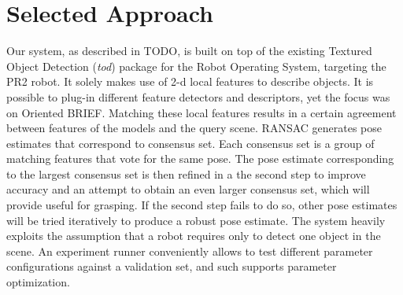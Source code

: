 
\section{Selected Approach}

Our system, as described in TODO, is built on top of the existing Textured
Object Detection ({\it tod}) package for the Robot Operating System, targeting
the PR2 robot. It solely makes use of 2-d local features to describe objects.
It is possible to plug-in different feature detectors and descriptors, yet the
focus was on Oriented BRIEF.  Matching these local features results in a
certain agreement between features of the models and the query scene. RANSAC
generates pose estimates that correspond to consensus set. Each consensus set
is a group of matching features that vote for the same pose. The pose estimate
corresponding to the largest consensus set is then refined in a the second step
to improve accuracy and an attempt to obtain an even larger consensus set,
which will provide useful for grasping. If the second step fails to do so,
other pose estimates will be tried iteratively to produce a robust pose
estimate. The system heavily exploits the assumption that a robot requires only
to detect one object in the scene. An experiment runner conveniently allows to
test different parameter configurations against a validation set, and such
supports parameter optimization.

